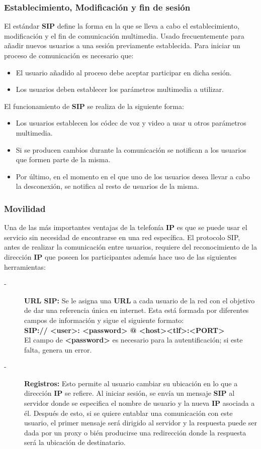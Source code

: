 \documentclass[a4paper, 11pt]{article} %
\begin{document}
		\subsubsection{Establecimiento, Modificación y fin de sesión}
		El estándar \textbf{SIP} define la forma en la que se lleva a cabo el establecimiento, modificación y el fin de comunicación multimedia. Usado frecuentemente para añadir nuevos usuarios a una sesión previamente establecida. Para iniciar un proceso de comunicación es necesario que:
		\begin{itemize}
			\item El usuario añadido al proceso debe aceptar participar en dicha sesión.
			\item Los usuarios deben establecer los parámetros multimedia a utilizar.
		\end{itemize}
		El funcionamiento de \textbf{SIP} se realiza de la siguiente forma:
		\begin{itemize}
			\item Los usuarios establecen los códec de voz y video a usar u otros parámetros multimedia.
			\item Si se producen cambios durante la comunicación se notifican a los usuarios que formen parte de la misma.
			\item Por último, en el momento en el que uno de los usuarios desea llevar a cabo la desconexión, se notifica al resto de usuarios de la misma.
		\end{itemize}				
		
		\subsubsection{Movilidad}
		Una de las más importantes ventajas de la telefonía \textbf{IP} es que se puede usar el servicio sin necesidad de encontrarse en una red específica. El protocolo SIP, antes de realizar la comunicación entre usuarios, requiere del reconocimiento de la dirección \textbf{IP} que poseen los participantes además hace uso de las siguientes herramientas:
		\begin{description}
			\item[-]\textbf{URL SIP:} Se le asigna una \textbf{URL} a cada usuario de la red con el objetivo de dar una referencia única en internet. Esta está formada por diferentes campos de información y sigue el siguiente formato:\\
			\textbf{SIP:// <user>: <password> @ <host><tlf>:<PORT>}\\
			El campo de \textbf{<password>} es necesario para la autentificación; si este falta, genera un error.
			\item[-]\textbf{Registros:} Esto permite al usuario cambiar su ubicación en lo que a dirección \textbf{IP} se refiere. Al iniciar sesión, se envía un mensaje \textbf{SIP} al servidor donde se especifica el nombre de usuario y la nueva \textbf{IP} asociada a él. Después de esto, si se quiere entablar una comunicación con este usuario, el primer mensaje será dirigido al servidor y la respuesta puede ser dada por un proxy o bién producirse una redirección donde la respuesta será la ubicación de destinatario.
		\end{description}
	
\end{document}
